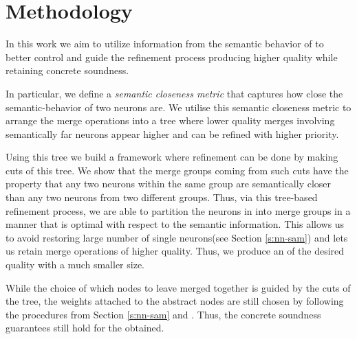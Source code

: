 \section{Methodology}
\label{s:semantic-closeness}



 
In this work we aim to utilize information from the semantic behavior of \cnc to
better control and guide the refinement process producing higher quality \abs
while retaining concrete soundness. 

In particular, we define a \textit{semantic
closeness metric} that captures how close the semantic-behavior of two 
neurons are. We utilise this semantic closeness metric to arrange the merge
operations into a tree where lower quality merges involving semantically far
neurons appear higher and can be refined with higher priority. 

Using this tree we build a framework  where refinement can
be done by making cuts of this tree. We show that the merge groups coming from
such cuts have the property that any two neurons within the same group are 
semantically closer than any two neurons from two different groups. Thus, via
this tree-based refinement process, we are able to partition the neurons in \cnc
into merge groups in a manner that is
optimal with respect to the semantic information.
This allows us to avoid restoring large number of single neurons(see Section
\ref{s:nn-sam}) and lets us retain merge operations of higher quality. Thus, we
produce an \abs of the desired quality with a much smaller size. 

While the choice of which nodes to leave merged together is guided by the cuts
of the tree, the weights attached to the abstract nodes are still chosen
by following the procedures from Section \ref{s:nn-sam} and \cite{cegar-nn}.
Thus, the concrete soundness guarantees still hold for the \abs obtained.


